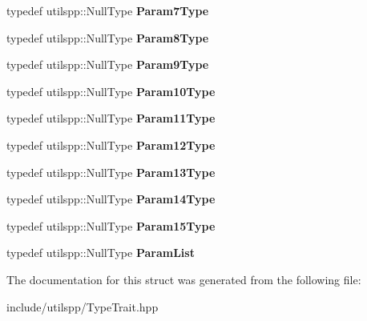 \begin{DoxyCompactItemize}
\item 
\hypertarget{structutilspp_1_1PointerOnMemberFunction_a3be930f0db56fc812ff1740475323396}{typedef utilspp\-::\-Null\-Type {\bfseries Param7\-Type}}\label{structutilspp_1_1PointerOnMemberFunction_a3be930f0db56fc812ff1740475323396}

\item 
\hypertarget{structutilspp_1_1PointerOnMemberFunction_acb6f9eb9bb4d3f9824d1cc8309c010fd}{typedef utilspp\-::\-Null\-Type {\bfseries Param8\-Type}}\label{structutilspp_1_1PointerOnMemberFunction_acb6f9eb9bb4d3f9824d1cc8309c010fd}

\item 
\hypertarget{structutilspp_1_1PointerOnMemberFunction_a4c1d38f9e03a809cab3b066d7c6d9c81}{typedef utilspp\-::\-Null\-Type {\bfseries Param9\-Type}}\label{structutilspp_1_1PointerOnMemberFunction_a4c1d38f9e03a809cab3b066d7c6d9c81}

\item 
\hypertarget{structutilspp_1_1PointerOnMemberFunction_ac14dc225d2b2ec7d8d11a1f11ddcd034}{typedef utilspp\-::\-Null\-Type {\bfseries Param10\-Type}}\label{structutilspp_1_1PointerOnMemberFunction_ac14dc225d2b2ec7d8d11a1f11ddcd034}

\item 
\hypertarget{structutilspp_1_1PointerOnMemberFunction_a77e4618194bbfa67e9794f93445608e6}{typedef utilspp\-::\-Null\-Type {\bfseries Param11\-Type}}\label{structutilspp_1_1PointerOnMemberFunction_a77e4618194bbfa67e9794f93445608e6}

\item 
\hypertarget{structutilspp_1_1PointerOnMemberFunction_ad872f1016f26cbc7900ac41cd86a0d24}{typedef utilspp\-::\-Null\-Type {\bfseries Param12\-Type}}\label{structutilspp_1_1PointerOnMemberFunction_ad872f1016f26cbc7900ac41cd86a0d24}

\item 
\hypertarget{structutilspp_1_1PointerOnMemberFunction_a67e264cfc0963d5c962f863955a69382}{typedef utilspp\-::\-Null\-Type {\bfseries Param13\-Type}}\label{structutilspp_1_1PointerOnMemberFunction_a67e264cfc0963d5c962f863955a69382}

\item 
\hypertarget{structutilspp_1_1PointerOnMemberFunction_a1ff51a342af6afb551da99c413fa7852}{typedef utilspp\-::\-Null\-Type {\bfseries Param14\-Type}}\label{structutilspp_1_1PointerOnMemberFunction_a1ff51a342af6afb551da99c413fa7852}

\item 
\hypertarget{structutilspp_1_1PointerOnMemberFunction_abe42f36e34591d422ae942e8cd519f3a}{typedef utilspp\-::\-Null\-Type {\bfseries Param15\-Type}}\label{structutilspp_1_1PointerOnMemberFunction_abe42f36e34591d422ae942e8cd519f3a}

\item 
\hypertarget{structutilspp_1_1PointerOnMemberFunction_a4b369852e6c9f592bc5ab0b85c6fed11}{typedef utilspp\-::\-Null\-Type {\bfseries Param\-List}}\label{structutilspp_1_1PointerOnMemberFunction_a4b369852e6c9f592bc5ab0b85c6fed11}

\end{DoxyCompactItemize}


The documentation for this struct was generated from the following file\-:\begin{DoxyCompactItemize}
\item 
include/utilspp/Type\-Trait.\-hpp\end{DoxyCompactItemize}
